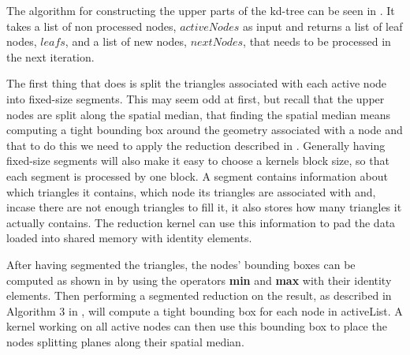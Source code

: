 \begin{algorithm}
\begin{algorithmic}
{                 \STATE{}


                   \ELSE
                   \ENDIF
                 \ENDFOR
  }
  \end{algorithmic}
\end{algorithm}


The algorithm for constructing the upper parts of the kd-tree can be
seen in . It takes a list of non
processed nodes, $activeNodes$ as input and returns a list of leaf
nodes, $leafs$, and a list of new nodes, $nextNodes$, that needs to be
processed in the next iteration.



The first thing that  does is split the triangles
associated with each active node into fixed-size segments. This may seem odd at
first, but recall that the upper nodes are split along the spatial median, that
finding the spatial median means computing a tight bounding box around the
geometry associated with a node and that to do this we need to apply the
reduction described in . Generally having fixed-size
segments will also make it easy to choose a kernels block size, so that each
segment is processed by one block. A segment contains information about which
triangles it contains, which node its triangles are associated with and, incase
there are not enough triangles to fill it, it also stores how many triangles it
actually contains. The reduction kernel can use this information to pad the data
loaded into shared memory with identity elements.

After having segmented the triangles, the nodes' bounding boxes can be computed
as shown in  by using the operators \textbf{min} and
\textbf{max} with their identity elements. Then performing a segmented reduction
on the result, as described in Algorithm 3 in \zhou, will compute a tight
bounding box for each node in activeList. A kernel working on all active nodes
can then use this bounding box to place the nodes splitting planes along their
spatial median.

